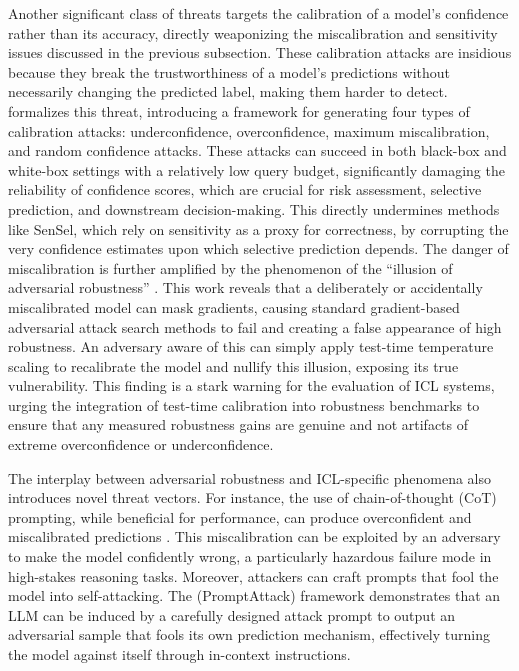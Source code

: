 \documentclass[11pt]{article}
\begin{document}
Another significant class of threats targets the calibration of a model's confidence rather than its accuracy, directly weaponizing the miscalibration and sensitivity issues discussed in the previous subsection. These calibration attacks are insidious because they break the trustworthiness of a model's predictions without necessarily changing the predicted label, making them harder to detect. \cite{ref421} formalizes this threat, introducing a framework for generating four types of calibration attacks: underconfidence, overconfidence, maximum miscalibration, and random confidence attacks. These attacks can succeed in both black-box and white-box settings with a relatively low query budget, significantly damaging the reliability of confidence scores, which are crucial for risk assessment, selective prediction, and downstream decision-making. This directly undermines methods like SenSel, which rely on sensitivity as a proxy for correctness, by corrupting the very confidence estimates upon which selective prediction depends. The danger of miscalibration is further amplified by the phenomenon of the ``illusion of adversarial robustness'' \cite{ref431}. This work reveals that a deliberately or accidentally miscalibrated model can mask gradients, causing standard gradient-based adversarial attack search methods to fail and creating a false appearance of high robustness. An adversary aware of this can simply apply test-time temperature scaling to recalibrate the model and nullify this illusion, exposing its true vulnerability. This finding is a stark warning for the evaluation of ICL systems, urging the integration of test-time calibration into robustness benchmarks to ensure that any measured robustness gains are genuine and not artifacts of extreme overconfidence or underconfidence.

The interplay between adversarial robustness and ICL-specific phenomena also introduces novel threat vectors. For instance, the use of chain-of-thought (CoT) prompting, while beneficial for performance, can produce overconfident and miscalibrated predictions \cite{ref38}. This miscalibration can be exploited by an adversary to make the model confidently wrong, a particularly hazardous failure mode in high-stakes reasoning tasks. Moreover, attackers can craft prompts that fool the model into self-attacking. The \cite{ref432} (PromptAttack) framework demonstrates that an LLM can be induced by a carefully designed attack prompt to output an adversarial sample that fools its own prediction mechanism, effectively turning the model against itself through in-context instructions.
\end{document}

